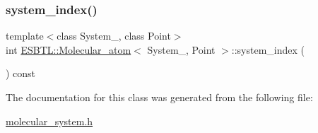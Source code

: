 \mbox{\label{classESBTL_1_1Molecular__atom_aa82969b5f5bb9bd0f59f4ad6548ea756}} 
\subsubsection{\texorpdfstring{system\+\_\+index()}{system\_index()}}
{\footnotesize\ttfamily template$<$class System\+\_\+, class Point$>$ \\
int \hyperlink{classESBTL_1_1Molecular__atom}{E\+S\+B\+T\+L\+::\+Molecular\+\_\+atom}$<$ System\+\_\+, Point $>$\+::system\+\_\+index (\begin{DoxyParamCaption}{ }\end{DoxyParamCaption}) const\hspace{0.3cm}{\ttfamily [inline]}}



The documentation for this class was generated from the following file\+:\begin{DoxyCompactItemize}
\item 
\hyperlink{molecular__system_8h}{molecular\+\_\+system.\+h}\end{DoxyCompactItemize}
